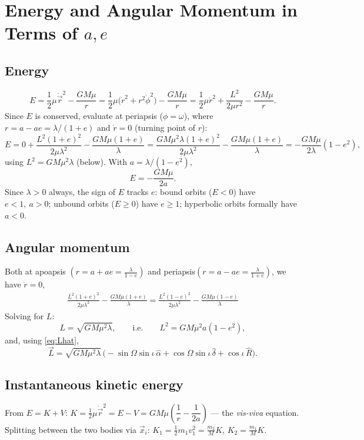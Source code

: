 \documentclass[11pt]{article}
\newcommand{\vecr}{\vec r}
\newcommand{\vecL}{\vec L}
\newcommand{\vecx}{\vec x}
\begin{document}
\section{Energy and Angular Momentum in Terms of \texorpdfstring{$a,e$}{a,e}}

\subsection{Energy}
\[
E=\frac12\mu\dot{\vecr}^2-\frac{GM\mu}{r} = \frac12\mu\big(\dot r^2+r^2\dot\phi^2\big)-\frac{GM\mu}{r}
=\frac12\mu\dot r^2+\frac{L^2}{2\mu r^2}-\frac{GM\mu}{r}.
\]
Since $E$ is conserved, evaluate at periapsis ($\phi=\omega$), where $r=a-ae=\lambda/(1+e)$ and $\dot r=0$ (turning point of $r$):
\[
E = 0+\frac{L^2(1+e)^2}{2\mu\lambda^2}-\frac{GM\mu(1+e)}{\lambda}
=\frac{GM\mu^2\lambda(1+e)^2}{2\mu\lambda^2}-\frac{GM\mu(1+e)}{\lambda}
=-\frac{GM\mu}{2\lambda}(1-e^2),
\]
using $L^2=GM\mu^2\lambda$ (below). With $a=\lambda/(1-e^2)$,
\begin{equation}
\boxed{E=-\frac{GM\mu}{2a}.} \label{eq:visviva_E}
\end{equation}
Since $\lambda>0$ always, the sign of $E$ tracks $e$: bound orbits ($E<0$) have $e<1,\ a>0$; unbound orbits ($E\geq0$) have $e\geq1$; hyperbolic orbits formally have $a<0$.

\subsection{Angular momentum}
Both at apoapsis $(r=a+ae=\frac{\lambda}{1-e})$ and periapsis$(r=a-ae=\frac{\lambda}{1+e})$, we have $\dot{r}=0$,
\begin{align}
\frac{L^2(1+e)^2}{2\mu\lambda^2}-\frac{GM\mu(1+e)}{\lambda}
=\frac{L^2(1-e)^2}{2\mu\lambda^2}-\frac{GM\mu(1-e)}{\lambda}
\end{align}
Solving for $L$:
\begin{equation}
L=\sqrt{GM\mu^2\lambda}, \qquad\text{i.e.}\qquad L^2=GM\mu^2 a(1-e^2), \label{eq:L_of_ae}
\end{equation}
and, using \eqref{eq:Lhat},
\[
\vecL = \sqrt{GM\mu^2\lambda}\,\big(-\sin\Omega\sin\iota\,\hat\alpha+\cos\Omega\sin\iota\,\hat\delta+\cos\iota\,\hat R\big).
\]

\subsection{Instantaneous kinetic energy}
From $E=K+V$: $K=\tfrac12\mu\dot{\vecr}^2 = E-V= GM\mu\left(\dfrac1r-\dfrac1{2a}\right)$ — the \emph{vis-viva} equation. Splitting between the two bodies via $\vecx_i$: $K_1=\tfrac12 m_1v_1^2=\tfrac{m_2}{M}K$, $K_2=\tfrac{m_1}{M}K$.
\end{document}
